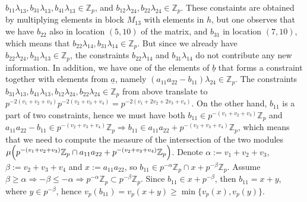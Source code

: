 \documentclass{article}
\begin{document}
$b_{11}\lambda_{13},b_{31}\lambda_{13},b_{41}\lambda_{13}\in\mathbb{Z}_{p}$, and $b_{12}\lambda_{24},b_{22}\lambda_{24}\in\mathbb{Z}_{p}$. These constaints are obtained by multiplying elements in block $M_{13}$ with elements in $h$, but one observes that we have $b_{22}$ also in location $(5,10)$ of the matrix, and $b_{31}$ in location $(7,10)$, which means that $b_{22}\lambda_{14},b_{31}\lambda_{14}\in\mathbb{Z}_{p}$. But since we already have $b_{22}\lambda_{24},b_{31}\lambda_{13}\in\mathbb{Z}_{p}$, the constraints $b_{22}\lambda_{14}$ and $b_{31}\lambda_{14}$ do not contribute any new information. In addition, we have one of the elements of $\underline{b}$ that forms a constraint together with elements from $\underline{a}$, namely $(a_{11}a_{22}-b_{11})\lambda_{24}\in\mathbb{Z}_{p}$. The constraints $b_{31}\lambda_{13},b_{41}\lambda_{13},b_{12}\lambda_{24},b_{22}\lambda_{24}\in\mathbb{Z}_{p}$ from above translate to $p^{-2(v_{1}+v_{2}+v_{3})}p^{-2(v_{2}+v_{3}+v_{4})}=p^{-2(v_{1}+2v_{2}+2v_{3}+v_{4})}$. On the other hand, $b_{11}$ is a part of two constraints, hence we must have both $b_{11}\in{p^{-(v_{1}+v_{2}+v_{3})}\mathbb{Z}_{p}}$ and $a_{11}a_{22}-b_{11}\in{p^{-(v_{2}+v_{3}+v_{4})}\mathbb{Z}_{p}}\Rightarrow{b_{11}\in{a_{11}a_{22}+p^{-(v_{2}+v_{3}+v_{4})}\mathbb{Z}_{p}}}$, which means that we need to compute the measure of the intersection of the two modules $\mu\Bigl(p^{-(v_{1}+v_{2}+v_{3})}\mathbb{Z}_{p}\cap{a_{11}a_{22}+p^{-(v_{2}+v_{3}+v_{4})}\mathbb{Z}_{p}\Bigr)}$. Denote $\alpha:=v_{1}+v_{2}+v_{3}$, $\beta:=v_{2}+v_{3}+v_{4}$ and $x:=a_{11}a_{22}$, so $b_{11}\in{p^{-\alpha}\mathbb{Z}_{p}\cap{x+p^{-\beta}}\mathbb{Z}_{p}}$. Assume $\beta\geq\alpha\Rightarrow{-\beta\leq-\alpha\Rightarrow{p^{-\alpha}\mathbb{Z}_{p}\subset{p^{-\beta}\mathbb{Z}_{p}}}}$. Since $b_{11}\in{x+p^{-\beta}}$, then $b_{11}=x+y$, where $y\in{p^{-\beta}}$, hence $v_{p}(b_{11})=v_{p}(x+y)\geq{\min\{v_{p}(x),v_{p}(y)\}}$.
\end{document}
